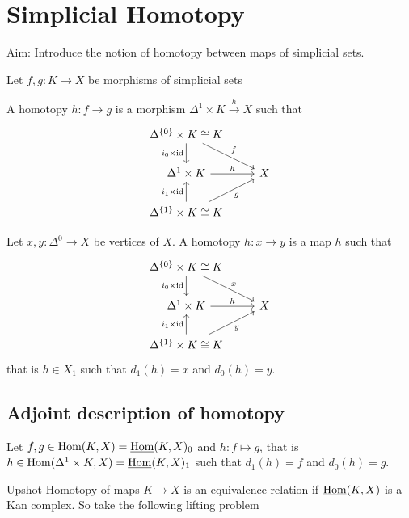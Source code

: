 \section{Simplicial Homotopy}

Aim: Introduce the notion of homotopy between maps of simplicial sets.

\begin{defi}
    Let $f,g \colon K \to X$ be morphisms of simplicial sets
\end{defi}

A homotopy $h\colon f \to g$ is a morphism $\Delta^1 \times K \xrightarrow{h} X$ such that 
\[
\begin{tikzcd}
    \Delta^{\{0\}} \times K \cong K
    \ar[d, "i_0 \times \id"']
    \ar[dr, "f"]
    \\
    \Delta^1 \times K 
    \ar[r,"h"]
    &
    X
    \\
    \Delta^{\{1\}}\times K \cong K
    \ar[u,"i_1 \times \id"]
    \ar[ur, "g"']
\end{tikzcd}
\]

\begin{exmp}
    Let $x,y \colon \Delta^0 \to X$ be vertices of $X$. 
    A homotopy $h\colon x \to y$ is a map $h$ such that
    \[
    \begin{tikzcd}
        \Delta^{\{0\}} \times K \cong K
        \ar[d, "i_0 \times \id"']
        \ar[dr, "x"]
        \\
        \Delta^1 \times K 
        \ar[r,"h"]
        &
        X
        \\
        \Delta^{\{1\}}\times K \cong K
        \ar[u,"i_1 \times \id"]
        \ar[ur, "y"']
    \end{tikzcd}
    \]
    that is $h \in X_1$ such that $d_1(h)=x$ and $d_0(h)=y$.
\end{exmp}

\subsection{Adjoint description of homotopy}
Let $f,g \in \operatorname{Hom}(K,X) = \underline{\operatorname{Hom}}(K,X)_0$ and $h\colon f\mapsto g$, that is $h \in \operatorname{Hom}(\Delta^1 \times K, X) = \underline{\operatorname{Hom}}(K,X)_1$ such that $d_1(h)=f$ and $d_0(h)=g$.

\underline{Upshot} Homotopy of maps $K \to X$ is an equivalence relation if $\underline{\operatorname{Hom}}(K,X)$ is a Kan complex.
So take the following lifting problem

